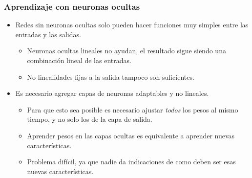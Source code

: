 \documentclass{beamer}
\begin{document}
\begin{frame}
  \frametitle{Aprendizaje con neuronas ocultas}

  \begin{itemize}
  \item Redes sin neuronas ocultas solo pueden hacer funciones muy
    simples entre las entradas y las salidas.
    \begin{itemize}
    \item Neuronas ocultas lineales no ayudan, el resultado sigue
      siendo una combinación lineal de las entradas.
    \item No linealidades fijas a la salida tampoco son suficientes.
    \end{itemize}
  \item Es necesario agregar capas de neuronas adaptables y no
    lineales.
    \begin{itemize}
    \item Para que esto sea posible es necesario ajustar \emph{todos}
      los pesos al mismo tiempo, y no solo los de la capa de salida.
    \item Aprender pesos en las capas ocultas es equivalente a
      aprender nuevas características.
    \item Problema difícil, ya que nadie da indicaciones de como deben
      ser esas nuevas características.
    \end{itemize}
  \end{itemize}

\end{frame}
\end{document}
